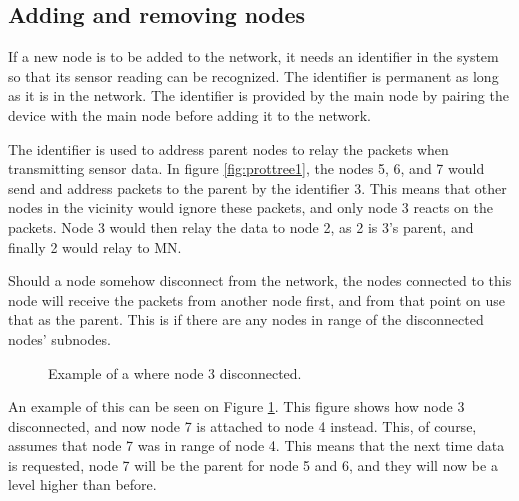 \subsection{Adding and removing nodes}
If a new node is to be added to the network, it needs an identifier in the system so that its sensor reading can be recognized. The identifier is permanent as long as it is in the network.
The identifier is provided by the main node by pairing the device with the main node before adding it to the network. 

The identifier is used to address parent nodes to relay the packets when transmitting sensor data. In figure \ref{fig:prottree1}, the nodes 5, 6, and 7 would send and address packets to the parent by the identifier 3. This means that other nodes in the vicinity would ignore these packets, and only node 3 reacts on the packets. Node 3 would then relay the data to node 2, as 2 is 3's parent, and finally 2 would relay to MN.

Should a node somehow disconnect from the network, the nodes connected to this node will receive the packets from another node first, and from that point on use that as the parent. This is if there are any nodes in range of the disconnected nodes' subnodes. 

\begin{figure}[!h]
	\centering
	\caption{Example of a where node 3 disconnected.}
	\label{fig:prottree2}
\end{figure}

An example of this can be seen on Figure \ref{fig:prottree2}. This figure shows how node 3 disconnected, and now node 7 is attached to node 4 instead. This, of course, assumes that node 7 was in range of node 4.
This means that the next time data is requested, node 7 will be the parent for node 5 and 6, and they will now be a level higher than before.
